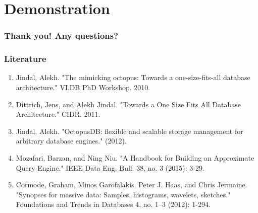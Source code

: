 \documentclass{beamer}
\begin{document}
\section{Demonstration}

\begin{frame}
\end{frame}

\begin{frame}
 \frametitle{Thank you! Any questions?}
\end{frame}

\begin{frame}
\frametitle{Literature}
\begin{enumerate}
\item{Jindal, Alekh. "The mimicking octopus: Towards a one-size-fits-all database architecture." VLDB PhD Workshop. 2010.}
\item{Dittrich, Jens, and Alekh Jindal. "Towards a One Size Fits All Database Architecture." CIDR. 2011.}
\item{Jindal, Alekh. "OctopusDB: flexible and scalable storage management for arbitrary database engines." (2012).}
\item{Mozafari, Barzan, and Ning Niu. "A Handbook for Building an Approximate Query Engine." IEEE Data Eng. Bull. 38, no. 3 (2015): 3-29.}
\item{Cormode, Graham, Minos Garofalakis, Peter J. Haas, and Chris Jermaine. "Synopses for massive data: Samples, histograms, wavelets, sketches." Foundations and Trends in Databases 4, no. 1–3 (2012): 1-294.}
\end{enumerate}
\end{frame}
\end{document}
